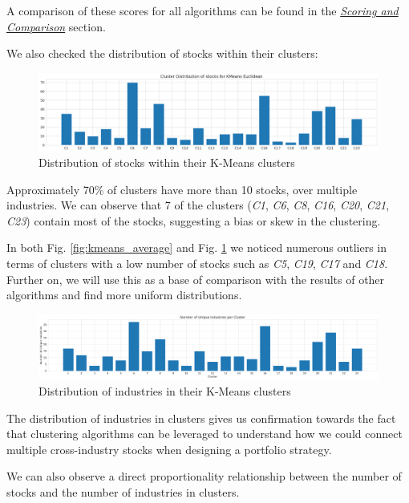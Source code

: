 \documentclass[11pt]{article}
\begin{document}
A comparison of these scores for all algorithms can be found in the \textit{\hyperref[sec:compare]{Scoring and Comparison}} section.

We also checked the distribution of stocks within their clusters:

\begin{figure}[H]
\centering
\includegraphics[width=12cm]{img/kmeans-euclidean-distrib.png} 
\caption{Distribution of stocks within their K-Means clusters}
\label{fig:euclidean_distrib}
\end{figure}

Approximately 70\% of clusters have more than 10 stocks, over multiple industries. We can observe that 7 of the clusters (\textit{C1}, \textit{C6}, \textit{C8}, \textit{C16}, \textit{C20}, \textit{C21}, \textit{C23}) contain most of the stocks, suggesting a bias or skew in the clustering. 

In both Fig. \ref{fig:kmeans_average} and Fig. \ref{fig:euclidean_distrib} we noticed numerous outliers in terms of clusters with a low number of stocks such as \textit{C5}, \textit{C19}, \textit{C17} and \textit{C18}. Further on, we will use this as a base of comparison with the results of other algorithms and find more uniform distributions.

\begin{figure}[H]
\centering
\includegraphics[width=12cm]{img/kmeans-industries.png} 
\caption{Distribution of industries in their K-Means clusters}
\label{fig:kmeans_industries}
\end{figure}

The distribution of industries in clusters gives us confirmation towards the fact that clustering algorithms can be leveraged to understand how we could connect multiple cross-industry stocks when designing a portfolio strategy.

We can also observe a direct proportionality relationship between the number of stocks and the number of industries in clusters.
\end{document}
